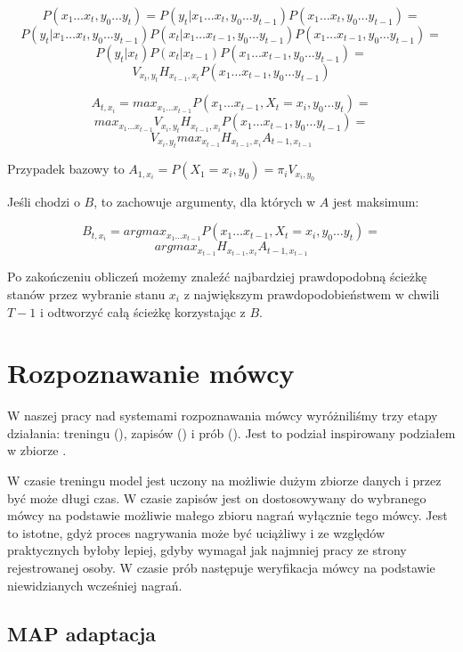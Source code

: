 $$P(x_1 \dots x_t, y_0 \dots y_t) = P(y_t | x_1 \dots x_t, y_0 \dots y_{t-1}) P(x_1 \dots x_t, y_0 \dots y_{t-1}) =$$
$$P(y_t | x_1 \dots x_t, y_0 \dots y_{t-1}) P(x_t | x_1 \dots x_{t-1}, y_0 \dots y_{t-1}) P(x_1 \dots x_{t-1}, y_0 \dots y_{t-1}) =$$
$$P(y_t | x_t) P(x_t | x_{t-1}) P(x_1 \dots x_{t-1}, y_0 \dots y_{t-1}) =$$
$$V_{x_t, y_t} H_{x_{t-1}, x_t} P(x_1 \dots x_{t-1}, y_0 \dots y_{t-1})$$

$$A_{t,x_i} = max_{x_1 \dots x_{t-1}} P(x_1 \dots x_{t-1}, X_t = x_i, y_0 \dots y_t) =$$
$$max_{x_1 \dots x_{t-1}} V_{x_i, y_t} H_{x_{t-1}, x_i} P(x_1 \dots x_{t-1}, y_0 \dots y_{t-1}) =$$
$$V_{x_i, y_t} max_{x_{t-1}}H_{x_{t-1}, x_i} A_{t-1, x_{t-1}}$$

Przypadek bazowy to $A_{1,x_i} = P(X_1 = x_i, y_0) = \pi_i V_{x_i, y_0}$

Jeśli chodzi o $B$, to zachowuje argumenty, dla których w $A$ jest maksimum:

$$B_{t, x_i} = argmax_{x_1 \dots x_{t-1}} P(x_1 \dots x_{t-1}, X_t = x_i, y_0 \dots y_t) =$$
$$argmax_{x_{t-1}} H_{x_{t-1}, x_i} A_{t-1, x_{t-1}}$$

Po zakończeniu obliczeń możemy znaleźć najbardziej prawdopodobną ścieżkę stanów przez wybranie stanu $x_i$ z największym prawdopodobieństwem w chwili $T-1$ i odtworzyć całą ścieżkę korzystając z $B$\cite{aTutorialOnHidden}.

\section{Rozpoznawanie mówcy}\label{sec:rozpoznawanie_mowcy}

W naszej pracy nad systemami rozpoznawania mówcy wyróżniliśmy trzy etapy działania: treningu (),
zapisów () i prób (). Jest to podział inspirowany podziałem w zbiorze .

W czasie treningu model jest uczony na możliwie dużym zbiorze danych i przez być może długi czas. W czasie zapisów
jest on dostosowywany do wybranego mówcy na podstawie możliwie małego zbioru nagrań wyłącznie tego mówcy. Jest
to istotne, gdyż proces nagrywania może być uciążliwy i ze względów praktycznych byłoby lepiej, gdyby wymagał
jak najmniej pracy ze strony rejestrowanej osoby. W czasie prób następuje weryfikacja mówcy na podstawie niewidzianych
wcześniej nagrań.

\subsection{MAP adaptacja}

